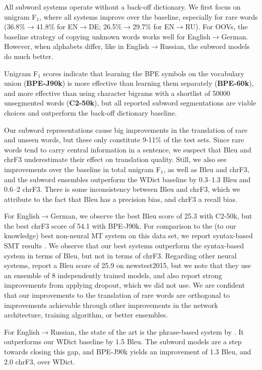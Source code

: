 \documentclass[11pt]{article}
\begin{document}
All subword systems operate without a back-off dictionary.
We first focus on unigram F$_1$, where all systems improve over the baseline,
especially for rare words (36.8\%$\rightarrow$41.8\% for EN$\to$DE; 26.5\%$\rightarrow$29.7\% for EN$\to$RU).
For OOVs, the baseline strategy of copying unknown words works well for English$\to$German.
However, when alphabets differ, like in English$\to$Russian, the subword models do much better.

Unigram F$_1$ scores indicate that learning the BPE symbols on the vocabulary union (\textbf{BPE-J90k})
is more effective than learning them separately (\textbf{BPE-60k}), and more effective than using character bigrams with a shortlist of \num{50000} unsegmented words (\textbf{C2-50k}),
but all reported subword segmentations are viable choices and outperform the back-off dictionary baseline.

Our subword representations cause big improvements in the translation of rare and unseen words, but these only constitute 9-11\% of the test sets.
Since rare words tend to carry central information in a sentence, we suspect that {\sc Bleu} and {\sc chrF3} underestimate their effect on translation quality.
Still, we also see improvements over the baseline in total unigram F$_1$, as well as {\sc Bleu} and {\sc chrF3}, and the subword ensembles outperform the WDict baseline by 0.3--1.3 {\sc Bleu} and 0.6--2 {\sc chrF3}.
There is some inconsistency between {\sc Bleu} and {\sc chrF3}, which we attribute to the fact that {\sc Bleu} has a precision bias, and {\sc chrF3} a recall bias.

For English$\to$German, we observe the best {\sc Bleu} score of 25.3 with C2-50k, but the best {\sc chrF3} score of 54.1 with BPE-J90k.
For comparison to the (to our knowledge) best non-neural MT system on this data set, we report syntax-based SMT results \cite{sennrichhaddow15}.
We observe that our best systems outperform the syntax-based system in terms of {\sc Bleu}, but not in terms of {\sc chrF3}.
Regarding other neural systems,  report a {\sc Bleu} score of 25.9 on newstest2015, but we note that they use an ensemble of 8 independently trained models, and also report strong improvements from applying dropout, which we did not use.
We are confident that our improvements to the translation of rare words are orthogonal to improvements achievable through other improvements in the network architecture, training algorithm, or better ensembles.

For English$\to$Russian, the state of the art is the phrase-based system by .
It outperforms our WDict baseline by 1.5 {\sc Bleu}.
The subword models are a step towards closing this gap, and BPE-J90k yields an improvement of 1.3 {\sc Bleu}, and 2.0 {\sc chrF3}, over WDict.
\end{document}
